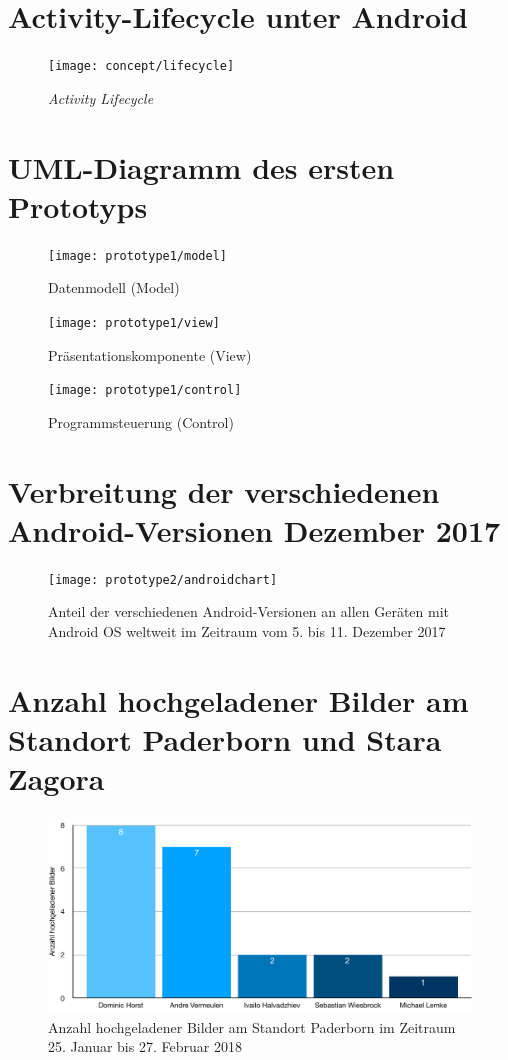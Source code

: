 \chapter{Activity-Lifecycle unter Android}
\begin{figure}[h]
  \centering
  \texttt{[image: concept/lifecycle]}
  \caption{\emph{Activity Lifecycle}}
  \label{fig:lifecycle}
\end{figure}

\chapter{UML-Diagramm des ersten Prototyps}\label{chap:uml}
\begin{figure}[h]
  \centering
  \texttt{[image: prototype1/model]}
  \caption{Datenmodell (Model)}
  \label{fig:model}
\end{figure}

\begin{figure}[h]
  \centering
  \texttt{[image: prototype1/view]}
  \caption{Präsentationskomponente (View)}
  \label{fig:view}
\end{figure}

\begin{figure}[h]
  \centering
  \texttt{[image: prototype1/control]}
  \caption{Programmsteuerung (Control)}
  \label{fig:control}
\end{figure}

\chapter{Verbreitung der verschiedenen Android-Versionen Dezember 2017}
\begin{figure}[h]
  \centering
  \texttt{[image: prototype2/androidchart]}
  \caption{Anteil der verschiedenen Android-Versionen an allen Geräten mit Android OS weltweit im Zeitraum vom 5. bis 11. Dezember 2017}
  \label{fig:versionchart}
\end{figure}

\chapter{Anzahl hochgeladener Bilder am Standort Paderborn und Stara Zagora}
\begin{figure}[h]
  \centering
  \includegraphics[keepaspectratio, width=\textwidth]{data/usage_pb}
  \caption{Anzahl hochgeladener Bilder am Standort Paderborn im Zeitraum 25. Januar bis 27. Februar 2018}
  \label{fig:usagepb}
\end{figure}

